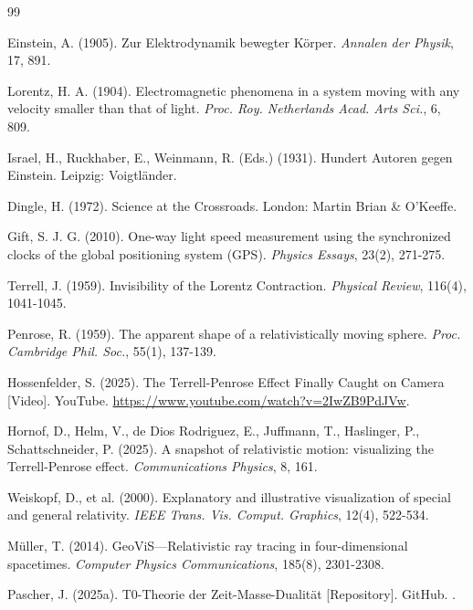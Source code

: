 	
	\begin{thebibliography}{99}
		
		Einstein, A. (1905). Zur Elektrodynamik bewegter Körper. \emph{Annalen der Physik}, 17, 891.
		
		Lorentz, H. A. (1904). Electromagnetic phenomena in a system moving with any velocity smaller than that of light. \emph{Proc. Roy. Netherlands Acad. Arts Sci.}, 6, 809.
		
		Israel, H., Ruckhaber, E., Weinmann, R. (Eds.) (1931). Hundert Autoren gegen Einstein. Leipzig: Voigtländer.
		
		Dingle, H. (1972). Science at the Crossroads. London: Martin Brian \& O'Keeffe.
		
		Gift, S. J. G. (2010). One-way light speed measurement using the synchronized clocks of the global positioning system (GPS). \emph{Physics Essays}, 23(2), 271-275.
		
		Terrell, J. (1959). Invisibility of the Lorentz Contraction. \emph{Physical Review}, 116(4), 1041-1045.
		
		Penrose, R. (1959). The apparent shape of a relativistically moving sphere. \emph{Proc. Cambridge Phil. Soc.}, 55(1), 137-139.
		
		Hossenfelder, S. (2025). The Terrell-Penrose Effect Finally Caught on Camera [Video]. YouTube. \url{https://www.youtube.com/watch?v=2IwZB9PdJVw}.
		
		Hornof, D., Helm, V., de Dios Rodriguez, E., Juffmann, T., Haslinger, P., Schattschneider, P. (2025). A snapshot of relativistic motion: visualizing the Terrell-Penrose effect. \emph{Communications Physics}, 8, 161.
		
		Weiskopf, D., et al. (2000). Explanatory and illustrative visualization of special and general relativity. \emph{IEEE Trans. Vis. Comput. Graphics}, 12(4), 522-534.
		
		Müller, T. (2014). GeoViS—Relativistic ray tracing in four-dimensional spacetimes. \emph{Computer Physics Communications}, 185(8), 2301-2308.
		
		Pascher, J. (2025a). T0-Theorie der Zeit-Masse-Dualität [Repository]. GitHub. .
		

\end{thebibliography}

